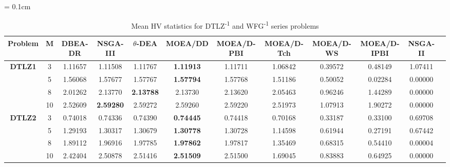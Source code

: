 \documentclass{sig-alternate}
\begin{document}
\begin{table}[!htb]\scriptsize
	\centering
	\renewcommand{\arraystretch}{0.9}
	\caption{Mean HV statistics for DTLZ\textsuperscript{-1} and WFG\textsuperscript{-1} series problems}
	\label{tab:HVminus}
	\tabcolsep = 0.1cm
	\begin{tabular}{|c|c|c|c|c|c|c|c|c|c|c|c|}
		\noalign{\smallskip}\hline
		\textbf{Problem}                & \textbf{M} & \textbf{DBEA-DR} & \textbf{NSGA-III} & \textbf{$\theta$-DEA} & \textbf{MOEA/DD} & \textbf{MOEA/D-PBI} & \textbf{MOEA/D-Tch} & \textbf{MOEA/D-WS} & \textbf{MOEA/D-IPBI} & \textbf{NSGA-II} \\ \hline
		\multirow{4}{*}{\textbf{DTLZ1}} & 3          & 1.11657          & 1.11508           & 1.11767               & \textbf{1.11913} & 1.11711             & 1.06842             & 0.39572            & 0.48149              & 1.07411          \\ \cline{2-11} 
		& 5          & 1.56068          & 1.57677           & 1.57767               & \textbf{1.57794} & 1.57768             & 1.51186             & 0.50052            & 0.02284              & 0.00000          \\ \cline{2-11} 
		& 8          & 2.01262          & 2.13770           & \textbf{2.13788}      & 2.13730          & 2.13620             & 2.05463             & 0.96246            & 1.44289              & 0.00000          \\ \cline{2-11} 
		& 10         & 2.52609          & \textbf{2.59280}  & 2.59272               & 2.59260          & 2.59220             & 2.51973             & 1.07913            & 1.90272              & 0.00000          \\ \hline
		\multirow{4}{*}{\textbf{DTLZ2}} & 3          & 0.74018          & 0.74336           & 0.74390               & \textbf{0.74445} & 0.74418             & 0.70168             & 0.33187            & 0.33100              & 0.69708          \\ \cline{2-11} 
		& 5          & 1.29193          & 1.30317           & 1.30679               & \textbf{1.30778} & 1.30728             & 1.14598             & 0.61944            & 0.27191              & 0.67442          \\ \cline{2-11} 
		& 8          & 1.89112          & 1.96916           & 1.97785               & \textbf{1.97862} & 1.97817             & 1.35469             & 0.68315            & 0.54410              & 0.00004          \\ \cline{2-11} 
		& 10         & 2.42404          & 2.50878           & 2.51416               & \textbf{2.51509} & 2.51500             & 1.69045             & 0.83883            & 0.64925              & 0.00000          \\ \hline

\end{tabular}
\end{table}
\end{document}
